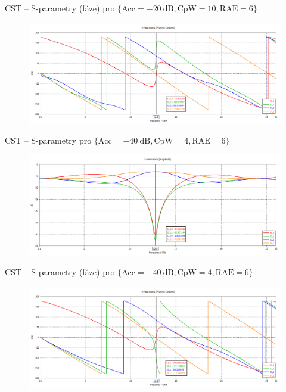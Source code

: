 \documentclass[aspectratio=169, 11pt, hyperref={unicode}]{beamer}
\begin{document}
\begin{frame}{CST -- S-parametry (fáze) pro $\{\text{Acc} = -20\ \text{dB}, \text{CpW} = 10, \text{RAE} = 6\}$}
	\begin{figure}[!ht]
		\centering
		\includegraphics[width=.8\textwidth]{src/CST_S-Parameters_phase_20dB_10-cpw_6-cntm.png}
	\end{figure}
\end{frame}
\begin{frame}{CST -- S-parametry pro $\{\text{Acc} = -40\ \text{dB}, \text{CpW} = 4, \text{RAE} = 6\}$}
	\begin{figure}[!ht]
		\centering
		\includegraphics[width=.8\textwidth]{src/CST_S-Parameters_40dB_4-cpw_6-cntm.png}
	\end{figure}
\end{frame}
\begin{frame}{CST -- S-parametry (fáze) pro $\{\text{Acc} = -40\ \text{dB}, \text{CpW} = 4, \text{RAE} = 6\}$}
	\begin{figure}[!ht]
		\centering
		\includegraphics[width=.8\textwidth]{src/CST_S-Parameters_phase_40dB_4-cpw_6-cntm.png}
	\end{figure}
\end{frame}
\end{document}
